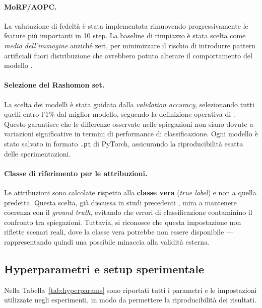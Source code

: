 \documentclass{article}
\begin{document}
\paragraph{MoRF/AOPC.}
La valutazione di fedeltà è stata implementata rimuovendo progressivamente le
feature più importanti in 10 step. La baseline di rimpiazzo è stata scelta come
\textit{media dell’immagine} anziché zeri, per minimizzare il rischio di
introdurre pattern artificiali fuori distribuzione che avrebbero potuto
alterare il comportamento del modello \citep{samek2016evaluating}.

\paragraph{Selezione del Rashomon set.}
La scelta dei modelli è stata guidata dalla \textit{validation accuracy},
selezionando tutti quelli entro l’1\% dal miglior modello, seguendo la
definizione operativa di \citet{mueller2023rashomon}. Questo garantisce che le
differenze osservate nelle spiegazioni non siano dovute a variazioni
significative in termini di performance di classificazione. Ogni modello è
stato salvato in formato \texttt{.pt} di PyTorch, assicurando la
riproducibilità esatta delle sperimentazioni.

\paragraph{Classe di riferimento per le attribuzioni.}
Le attribuzioni sono calcolate rispetto alla \textbf{classe vera} (\textit{true
      label}) e non a quella predetta. Questa scelta, già discussa in studi
precedenti \citep{arras2019evaluating}, mira a mantenere coerenza con il
\textit{ground truth}, evitando che errori di classificazione contaminino il
confronto tra spiegazioni. Tuttavia, si riconosce che questa impostazione non
riflette scenari reali, dove la classe vera potrebbe non essere disponibile —
rappresentando quindi una possibile minaccia alla validità esterna.

\subsection{Hyperparametri e setup sperimentale}

Nella Tabella~\ref{tab:hyperparams} sono riportati tutti i parametri e le
impostazioni utilizzate negli esperimenti, in modo da permettere la
riproducibilità dei risultati.
\end{document}
